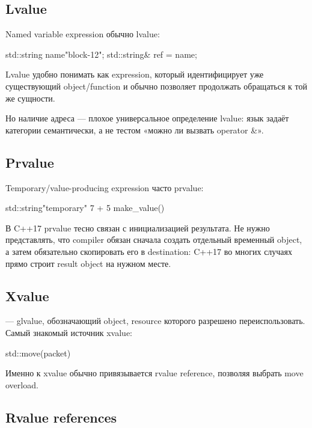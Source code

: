 \subsection{Lvalue}

Named variable expression обычно lvalue:

\begin{cppcode}
std::string name{"block-12"};
std::string& ref = name;
\end{cppcode}

Lvalue удобно понимать как expression, который идентифицирует уже существующий
object/function и обычно позволяет продолжать обращаться к той же сущности.

Но наличие адреса --- плохое универсальное определение lvalue: язык задаёт
категории семантически, а не тестом «можно ли вызвать operator \&».

\subsection{Prvalue}

Temporary/value-producing expression часто prvalue:

\begin{cppcode}
std::string{"temporary"}
7 + 5
make_value()
\end{cppcode}

В C++17 prvalue тесно связан с инициализацией результата. Не нужно представлять,
что compiler обязан сначала создать отдельный временный object, а затем
обязательно скопировать его в destination: C++17 во многих случаях прямо
строит result object на нужном месте.

\subsection{Xvalue}

 --- glvalue, обозначающий object, resource которого разрешено
переиспользовать. Самый знакомый источник xvalue:

\begin{cppcode}
std::move(packet)
\end{cppcode}

Именно к xvalue обычно привязывается rvalue reference, позволяя выбрать move
overload.

\subsection{Rvalue references}

